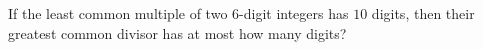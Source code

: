 If the least common multiple of two $6$-digit integers has $10$ digits, then their greatest common divisor has at most how many digits?
